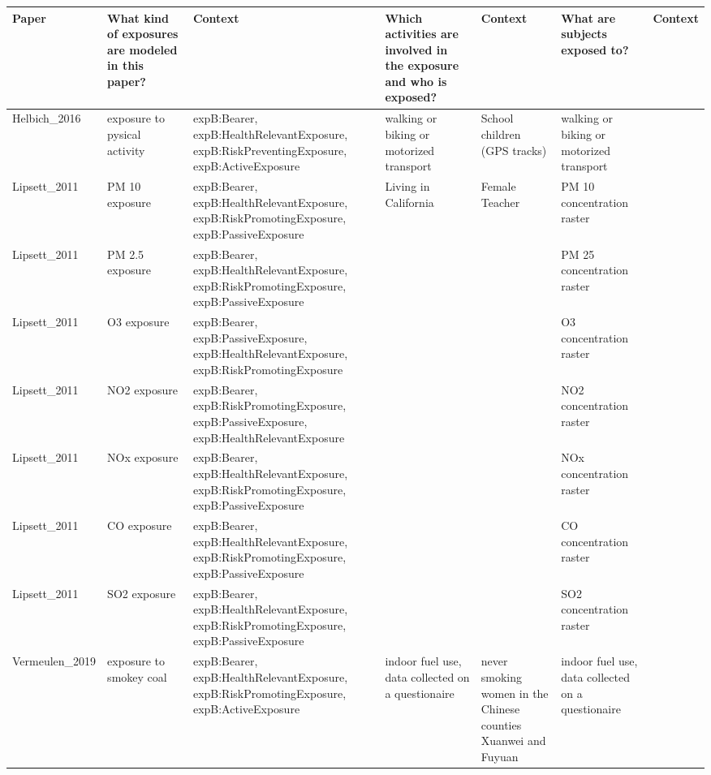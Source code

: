 \begin{tabular}{p{1cm}p{1cm}p{1cm}p{1cm}p{1cm}p{1cm}p{1cm}}
\toprule
          Paper & What kind of exposures are modeled in this paper? &                                                                                                         Context & Which activities are involved in the exposure and who is exposed? &                                                        Context &                     What are subjects exposed to? & Context \\
\midrule
Helbich\_2016 & exposure to pysical activity & expB:Bearer, expB:HealthRelevantExposure, expB:RiskPreventingExposure, expB:ActiveExposure & walking or biking or motorized transport & School children (GPS tracks) & walking or biking or motorized transport &  \\
Lipsett\_2011 & PM 10 exposure & expB:Bearer, expB:HealthRelevantExposure, expB:RiskPromotingExposure, expB:PassiveExposure & Living in California & Female Teacher & PM 10 concentration raster &  \\
Lipsett\_2011 & PM 2.5 exposure & expB:Bearer, expB:HealthRelevantExposure, expB:RiskPromotingExposure, expB:PassiveExposure &  &  & PM 25 concentration raster &  \\
Lipsett\_2011 & O3 exposure & expB:Bearer, expB:PassiveExposure, expB:HealthRelevantExposure, expB:RiskPromotingExposure &  &  & O3 concentration raster &  \\
Lipsett\_2011 & NO2 exposure & expB:Bearer, expB:RiskPromotingExposure, expB:PassiveExposure, expB:HealthRelevantExposure &  &  & NO2 concentration raster &  \\
Lipsett\_2011 & NOx exposure & expB:Bearer, expB:HealthRelevantExposure, expB:RiskPromotingExposure, expB:PassiveExposure &  &  & NOx concentration raster &  \\
Lipsett\_2011 & CO exposure & expB:Bearer, expB:HealthRelevantExposure, expB:RiskPromotingExposure, expB:PassiveExposure &  &  & CO concentration raster &  \\
Lipsett\_2011 & SO2 exposure & expB:Bearer, expB:HealthRelevantExposure, expB:RiskPromotingExposure, expB:PassiveExposure &  &  & SO2 concentration raster &  \\
Vermeulen\_2019 & exposure to smokey coal & expB:Bearer, expB:HealthRelevantExposure, expB:RiskPromotingExposure, expB:ActiveExposure & indoor fuel use, data collected on a questionaire & never smoking women in the Chinese counties Xuanwei and Fuyuan & indoor fuel use, data collected on a questionaire &  \\

\end{tabular}
